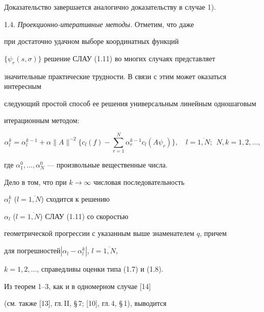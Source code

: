Доказательство завершается аналогично доказательству в случае 1).


\medskip





1.4. {\it Проекционно-итеративные методы.} Отметим, что даже 


при достаточно удачном выборе координатных функций


$\{\psi_r(s,\sigma )\}$ решение СЛАУ (1.11) во многих случаях представляет


значительные практические трудности. В связи с этим может оказаться интересным


следующий простой способ ее решения универсальным линейным одношаговым


итерационным методом:


\begin{equation}


\alpha _l^k=\alpha _l^{k-1}+\alpha \|A\|^{-2}\bigg\{ c_l(f)-


\sum_{r=1}^N \alpha_r^{k-1}c_l(A\psi_r)\bigg\},


\quad l=\overline{1,N};\ \ N,k=1,2,\dotsc,


\end{equation}


где $\alpha _1^0,\dotsc,\alpha_N^0$ --- произвольные вещественные числа.


Дело в том, что при $k\rightarrow \infty$ числовая последовательность


$\alpha _l^k$ ($l=\overline{1,N}$) сходится к решению


$\alpha _l$ ($l=\overline{1,N}$) СЛАУ (1.11) со скоростью


геометрической прогрессии с указанным выше знаменателем $q$, причем


для погрешностей\linebreak $|\alpha_l-\alpha _l^k|$, $l=\overline{1,N}$,


$k=1,2,\dotsc$, справедливы оценки типа (1.7) и (1.8).





Из теорем 1--3, как и в одномерном случае [14] 


(см. также [13], гл.\,II, \S\,7; [10], гл.\,4, \S\,1), выводится 





